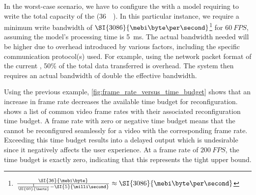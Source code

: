 In the worst-case scenario, we have to configure the \graicore{} with a model requiring to write the total capacity of the \graicore{} (\SI{36}{\mebi\byte}).
In this particular instance, we require a minimum write bandwidth of $\SI{3086}{\mebi\byte\per\second}$\footnote{$\frac{\SI{36}{\mebi\byte}}{\frac{1}{\SI{60}{\hertz}} - \SI{5}{\milli\second}} \approx \SI{3086}{\mebi\byte\per\second}$} for $\SI{60}{FPS}$, assuming the model's processing time is \SI{5}{ms}.
The actual bandwidth needed will be higher due to overhead introduced by various factors, including the specific communication protocol(s) used.
For example, using the network packet format of the current \confignoc{}, 50\% of the total data transferred is overhead.
The system then requires an actual bandwidth of double the effective bandwidth.

Using the previous example, \cref{fig:frame_rate_versus_time_budget} shows that an increase in frame rate decreases the available time budget for reconfiguration.
 shows a list of common video frame rates with their associated reconfiguration time budget.
A frame rate with zero or negative time budget means that the \graicore{} cannot be reconfigured seamlessly for a video with the corresponding frame rate.
Exceeding this time budget results into a delayed output which is undesirable since it negatively affects the user experience.
At a frame rate of $\SI{200}{FPS}$, the time budget is exactly zero, indicating that this represents the tight upper bound.

